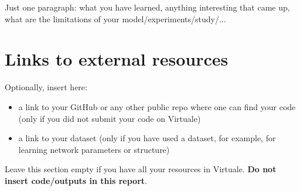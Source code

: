\documentclass[letterpaper]{article}
\begin{document}
Just one paragraph: what you have learned, anything interesting that came up, what are the limitations of your model/experiments/study/...


\section{Links to external resources}

Optionally, insert here:
\begin{itemize}
    \item a link to your GitHub or any other public repo where one can find your code (only if you did not submit your code on Virtuale) 
    \item a link to your dataset (only if you have used a dataset, for example, for learning network parameters or structure)
\end{itemize}
Leave this section empty if you have all your resources in Virtuale. \textbf{Do not insert code/outputs in this report}.

\bigskip




\end{document}
